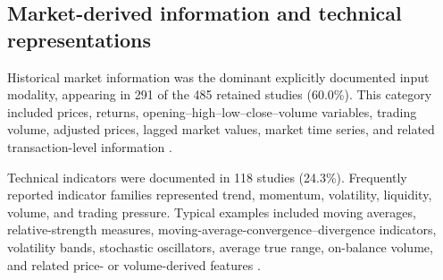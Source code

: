 \documentclass[pdflatex,sn-mathphys-num]{sn-jnl}%
\theoremstyle{thmstyleone}%
\theoremstyle{thmstyletwo}%
\theoremstyle{thmstylethree}%
\begin{document}



\subsection{Market-derived information and technical representations}
\label{subsec:market-derived-inputs}

Historical market information was the dominant explicitly documented
input modality, appearing in 291 of the 485 retained studies
(60.0\%). This category
included prices, returns, opening--high--low--close--volume variables,
trading volume, adjusted prices, lagged market values, market time
series, and related transaction-level information \cite{P00154,P00183,P00278,P00400,P00435}.

Technical indicators were documented in 118 studies (24.3\%).
Frequently reported indicator families represented trend, momentum,
volatility, liquidity, volume, and trading pressure. Typical examples
included moving averages, relative-strength measures,
moving-average-convergence--divergence indicators, volatility bands,
stochastic oscillators, average true range, on-balance volume, and
related price- or volume-derived features \cite{P00154,P00183,P00278,P00400,P00435}.
\end{document}
